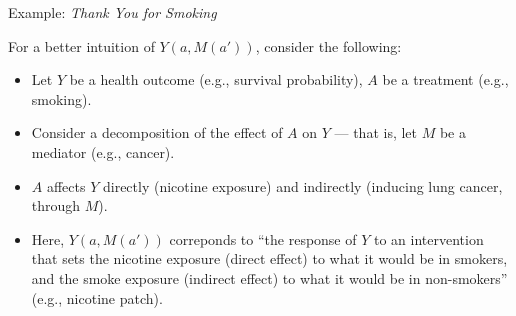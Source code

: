 \documentclass[12pt,t,handout]{beamer}
\begin{document}

\begin{frame}[c]{Example: \textit{Thank You for Smoking}}

For a better intuition of $Y(a, M(a'))$, consider the following:

\begin{center}
\begin{itemize}
  \itemsep4pt
  \item Let $Y$ be a health outcome (e.g., survival probability), $A$ be a
    treatment (e.g., smoking).
  \item Consider a decomposition of the effect of $A$ on $Y$ --- that is, let
    $M$ be a mediator (e.g., cancer).
  \item $A$ affects $Y$ directly (nicotine exposure) and indirectly (inducing
    lung cancer, through $M$).
  \item Here, $Y(a, M(a'))$ correponds to ``the response of $Y$ to an
    intervention that sets the nicotine exposure (direct effect) to what it
    would be in smokers, and the smoke exposure (indirect effect) to what it
    would be in non-smokers'' (e.g., nicotine patch).
\end{itemize}
\end{center}

\note{
}

\end{frame}

\end{document}
